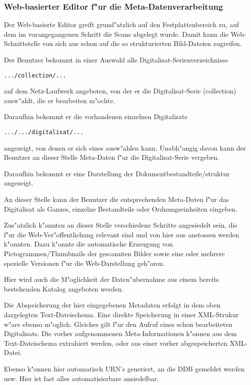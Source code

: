 \documentclass[11pt, twoside, a4paper, BCOR8mm, DIV12, bibtotoc,idxtotoc]{scrreprt}
\begin{document}
\subsubsection{Web-basierter Editor f"ur die Meta-Datenverarbeitung}
Der Web-basierte Editor greift grund"atzlich auf den
Festplattenbereich zu, auf dem im voran\-ge\-gan\-ge\-nen Schritt die
Scans abgelegt wurde. Damit kann die Web-Schnittstelle von sich aus
schon auf die so strukturierten Bild-Dateien zugreifen.

Der Benutzer bekommt in einer Auswahl alle 
Digitalisat-Serienverzeichnisse 
\begin{verbatim}
.../collection/...
\end{verbatim}
auf dem Netz-Laufwerk angeboten, von der
er die Digitalisat-Serie (collection) ausw"ahlt, die er
bearbeiten m"ochte.

Daraufhin bekommt er die vorhandenen einzelnen Digitalisate
\begin{verbatim}
.../.../digitalisat/...
\end{verbatim}
an\-ge\-zeigt, von denen er sich eines
ausw"ahlen kann. Unabh"angig davon kann der Benutzer an dieser Stelle
Meta-Daten f"ur die Digitalisat-Serie vergeben.

Daraufhin bekommt er eine Darstellung der Dokumentbestandteile/struktur
angezeigt. 

An dieser Stelle kann der Benutzer die entsprechenden Meta-Daten f"ur
das Digitalisat als Ganzes, einzelne Bestandteile oder
Ordnungseinheiten eingeben.

Zus"atzlich k"onnten an dieser Stelle verschiedene Schritte
angesiedelt sein, die f"ur die Web-Ver"offentlichung relevant sind und
von hier aus anstossen werden k"onnten. Dazu k"onnte die automatische
Erzeugung von Pictogrammen/Thumbnails der gescannten Bilder sowie eine
oder mehrere spezielle Versionen f"ur die Web-Darstellung geh"oren.

Hier wird auch die M"oglichkeit der Daten"uber\-nahme aus einem
bereits bestehenden Katalog angeboten werden.

Die Abspeicherung der hier eingegebenen Metadaten erfolgt in dem oben
dargelegten Text-Dateischema.  Eine direkte Speicherung in einer
XML-Strukur w"are ebenso m"oglich. Gleiches gilt f"ur den Aufruf eines
schon bearbeiteten Digitalisats. Die vorher aufgenommenen
Meta-Informationen k"onnen aus dem Text-Dateischema extrahiert werden,
oder aus einer vorher ab\-ge\-spei\-cher\-ten XML-Datei.

Ebenso k"onnen hier automatisch URN's generiert, an die DDB gemeldet
werden usw. Hier ist fast alles automatisierbare ansiedelbar.
\end{document}
